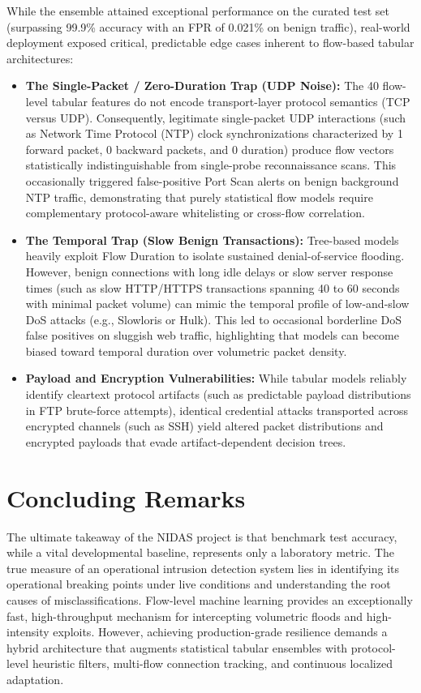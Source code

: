 \documentclass[12pt,a4paper]{report}
\begin{document}
While the ensemble attained exceptional performance on the curated test set (surpassing 99.9\% accuracy with an FPR of 0.021\% on benign traffic), real-world deployment exposed critical, predictable edge cases inherent to flow-based tabular architectures:
\begin{itemize}[leftmargin=*]
    \item \textbf{The Single-Packet / Zero-Duration Trap (UDP Noise):} The 40 flow-level tabular features do not encode transport-layer protocol semantics (TCP versus UDP). Consequently, legitimate single-packet UDP interactions (such as Network Time Protocol (NTP) clock synchronizations characterized by 1 forward packet, 0 backward packets, and 0 duration) produce flow vectors statistically indistinguishable from single-probe reconnaissance scans. This occasionally triggered false-positive Port Scan alerts on benign background NTP traffic, demonstrating that purely statistical flow models require complementary protocol-aware whitelisting or cross-flow correlation.
    \item \textbf{The Temporal Trap (Slow Benign Transactions):} Tree-based models heavily exploit Flow Duration to isolate sustained denial-of-service flooding. However, benign connections with long idle delays or slow server response times (such as slow HTTP/HTTPS transactions spanning 40 to 60 seconds with minimal packet volume) can mimic the temporal profile of low-and-slow DoS attacks (e.g., Slowloris or Hulk). This led to occasional borderline DoS false positives on sluggish web traffic, highlighting that models can become biased toward temporal duration over volumetric packet density.
    \item \textbf{Payload and Encryption Vulnerabilities:} While tabular models reliably identify cleartext protocol artifacts (such as predictable payload distributions in FTP brute-force attempts), identical credential attacks transported across encrypted channels (such as SSH) yield altered packet distributions and encrypted payloads that evade artifact-dependent decision trees.
\end{itemize}

\section{Concluding Remarks}

The ultimate takeaway of the NIDAS project is that benchmark test accuracy, while a vital developmental baseline, represents only a laboratory metric. The true measure of an operational intrusion detection system lies in identifying its operational breaking points under live conditions and understanding the root causes of misclassifications. Flow-level machine learning provides an exceptionally fast, high-throughput mechanism for intercepting volumetric floods and high-intensity exploits. However, achieving production-grade resilience demands a hybrid architecture that augments statistical tabular ensembles with protocol-level heuristic filters, multi-flow connection tracking, and continuous localized adaptation.
\end{document}
